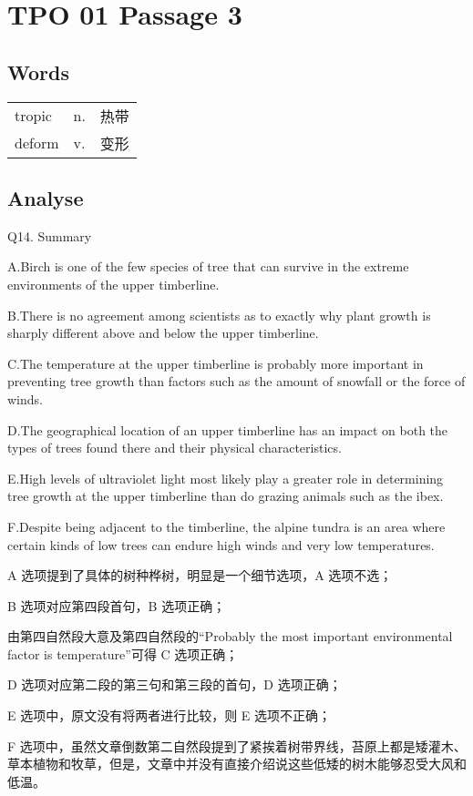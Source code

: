 \section{TPO 01 Passage 3}

\subsection{Words}

\begin{tabular}{lll}
    tropic & n. & 热带 \\
    deform & v. & 变形 \\
\end{tabular}

\subsection{Analyse}

\begin{blk}
    \begin{qst}
        Q14. Summary
    \end{qst}

    \begin{chc}
        A.Birch is one of the few species of tree that can survive in the extreme environments of the upper timberline.

        B.There is no agreement among scientists as to exactly why plant growth is sharply different above and below the upper timberline.

        C.The temperature at the upper timberline is probably more important in preventing tree growth than factors such as the amount of snowfall or the force of winds.

        D.The geographical location of an upper timberline has an impact on both the types of trees found there and their physical characteristics.

        E.High levels of ultraviolet light most likely play a greater role in determining tree growth at the upper timberline than do grazing animals such as the ibex.

        F.Despite being adjacent to the timberline, the alpine tundra is an area where certain kinds of low trees can endure high winds and very low temperatures.
    \end{chc}

    \begin{nlz}
        A 选项提到了具体的树种桦树，明显是一个细节选项，A 选项不选；

        B 选项对应第四段首句，B 选项正确；

        由第四自然段大意及第四自然段的“Probably the most important environmental factor is temperature”可得 C 选项正确；

        D 选项对应第二段的第三句和第三段的首句，D 选项正确；

        E 选项中，原文没有将两者进行比较，则 E 选项不正确；

        F 选项中，虽然文章倒数第二自然段提到了紧挨着树带界线，苔原上都是矮灌木、草本植物和牧草，但是，文章中并没有直接介绍说这些低矮的树木能够忍受大风和低温。
    \end{nlz}
\end{blk}
